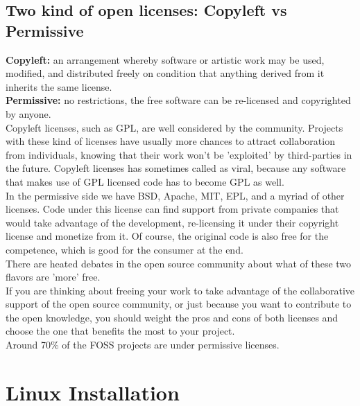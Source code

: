 \documentclass[a4paper]{article}
\begin{document}
\subsection{Two kind of open licenses: Copyleft vs Permissive}

\textbf{Copyleft:} an arrangement whereby software or artistic work may be used, modified, and distributed freely on condition that anything derived from it inherits the same license.\\
\textbf{Permissive:} no restrictions, the free software can be re-licensed and copyrighted by anyone.\\

Copyleft licenses, such as GPL, are well considered by the community. Projects with these kind of licenses have usually more chances to attract collaboration from individuals, knowing that their work won't be 'exploited' by third-parties in the future. Copyleft licenses has sometimes called as viral, because any software that makes use of GPL licensed code has to become GPL as well.\\

In the permissive side we have BSD, Apache, MIT, EPL, and a myriad of other licenses. Code under this license can find support from private companies that would take advantage of the development, re-licensing it under their copyright license and monetize from it. Of course, the original code is also free for the competence, which is good for the consumer at the end.\\

There are heated debates in the open source community about what of these two flavors are 'more' free.\\
If you are thinking about freeing your work to take advantage of the collaborative support of the open source community, or just because you want to contribute to the open knowledge, you should weight the pros and cons of both licenses and choose the one that benefits the most to your project.\\
Around 70\% of the FOSS projects are under permissive licenses.

\section{Linux Installation}
\end{document}

